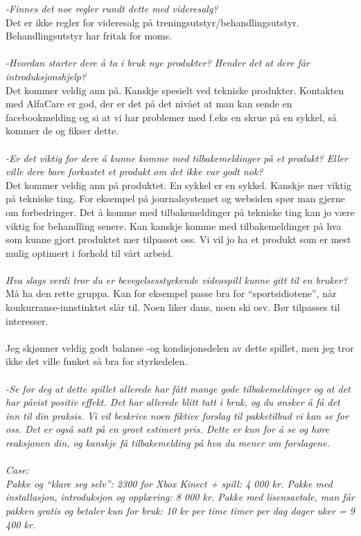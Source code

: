 \emph{-Finnes det noe regler rundt dette med videresalg?}\\
Det er ikke regler for videresalg på treningsutstyr/behandlingsutstyr. Behandlingsutstyr har fritak for moms. \\ \\
\emph{-Hvordan starter dere å ta i bruk nye produkter? Hender det at dere får introduksjonshjelp?}\\
Det kommer veldig ann på. Kanskje spesielt ved tekniske produkter. Kontakten med AlfaCare er god, der er det på det nivået at man kan sende en facebookmelding og si at vi har problemer med f.eks en skrue på en sykkel, så kommer de og fikser dette. \\ \\
\emph{-Er det viktig for dere å kunne komme med tilbakemeldinger på et produkt? Eller ville dere bare forkastet et produkt om det ikke var godt nok?}\\
Det kommer veldig ann på produktet. En sykkel er en sykkel. Kanskje mer viktig på tekniske ting. For eksempel på journalsystemet og websiden spør man gjerne om forbedringer. Det å komme med tilbakemeldinger på tekniske ting kan jo være viktig for behandling senere. Kan kanskje komme med tilbakemeldinger på hva som kunne gjort produktet mer tilpasset oss. Vi vil jo ha et produkt som er mest mulig optimert i forhold til vårt arbeid. \\ \\
\emph{Hva slags verdi tror du er bevegelsesstyrkende videospill kunne gitt til en bruker?}\\
Må ha den rette gruppa. Kan for eksempel passe bra for “sportsidiotene”, når konkurranse-innstinktet slår til. Noen liker dans, noen ski osv. Bør tilpasses til interesser.\\ \\
Jeg skjønner veldig godt balanse -og kondisjonsdelen av dette spillet, men jeg tror ikke det ville funket så bra for styrkedelen.\\ \\ 
\emph{-Se for deg at dette spillet allerede har fått mange gode tilbakemeldinger og at det har påvist positiv effekt. Det har allerede blitt tatt i bruk, og du ønsker å få det inn til din praksis. Vi vil beskrive noen fiktive forslag til pakketilbud vi kan se for oss. Det er også satt på en grovt estimert pris. Dette er kun for å se og høre reaksjonen din, og kanskje få tilbakemelding på hva du mener om forslagene.}\\ \\
\emph{Case:\\
Pakke og “klare seg selv”: 2300 for Xbox Kinect + spill: 4 000 kr.
Pakke med installasjon, introduksjon og opplæring:  8 000 kr.
Pakke med lisensavtale, man får pakken gratis og betaler kun for bruk: 10 kr per time  timer per dag  dager  uker = 9 400 kr.}\\ \\
